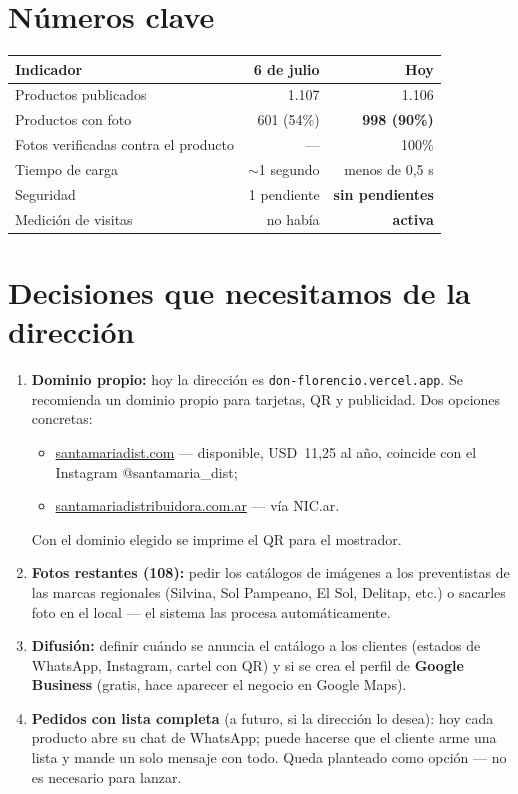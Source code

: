 \documentclass[a4paper,11pt]{article}
\begin{document}
\section{N\'umeros clave}

\begin{table}[h]
\centering
\begin{tabular}{lrr}
\toprule
\textbf{Indicador} & \textbf{6 de julio} & \textbf{Hoy} \\
\midrule
Productos publicados & 1.107 & 1.106 \\
Productos con foto & 601 (54\%) & \textbf{998 (90\%)} \\
Fotos verificadas contra el producto & --- & 100\% \\
Tiempo de carga & $\sim$1 segundo & menos de 0,5 s \\
Seguridad & 1 pendiente & \textbf{sin pendientes} \\
Medici\'on de visitas & no hab\'ia & \textbf{activa} \\
\bottomrule
\end{tabular}
\end{table}

\section{Decisiones que necesitamos de la direcci\'on}

\begin{enumerate}[leftmargin=1.4em, itemsep=4pt]
  \item \textbf{Dominio propio:} hoy la direcci\'on es \texttt{don-florencio.vercel.app}.
        Se recomienda un dominio propio para tarjetas, QR y publicidad. Dos opciones
        concretas:
        \begin{itemize}[leftmargin=1.2em, itemsep=1pt, topsep=2pt]
          \item \url{santamariadist.com} --- disponible, USD~11,25 al a\~no,
                coincide con el Instagram @santamaria\_dist;
          \item \url{santamariadistribuidora.com.ar} --- v\'ia NIC.ar.
        \end{itemize}
        Con el dominio elegido se imprime el QR para el mostrador.
  \item \textbf{Fotos restantes (108):} pedir los cat\'alogos de im\'agenes a los
        preventistas de las marcas regionales (Silvina, Sol Pampeano, El Sol, Delitap,
        etc.) o sacarles foto en el local --- el sistema las procesa autom\'aticamente.
  \item \textbf{Difusi\'on:} definir cu\'ando se anuncia el cat\'alogo a los clientes
        (estados de WhatsApp, Instagram, cartel con QR) y si se crea el perfil de
        \textbf{Google Business} (gratis, hace aparecer el negocio en Google Maps).
  \item \textbf{Pedidos con lista completa} (a futuro, si la direcci\'on lo desea):
        hoy cada producto abre su chat de WhatsApp; puede hacerse que el cliente arme
        una lista y mande un solo mensaje con todo. Queda planteado como opci\'on ---
        no es necesario para lanzar.
\end{enumerate}
\end{document}
